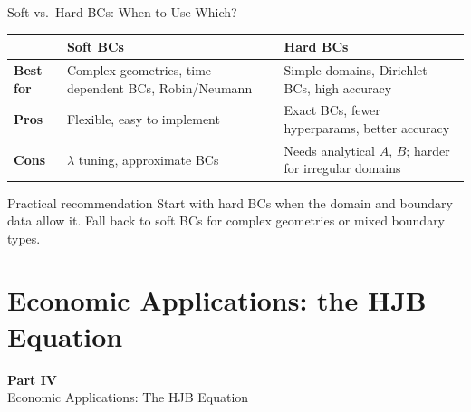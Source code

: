 \documentclass[aspectratio=169,11pt]{beamer}
\newcommand{\emphc}[1]{\textcolor{harvardcrimson}{#1}}
\begin{document}
\begin{frame}{Soft vs.\ Hard BCs: When to Use Which?}
\begin{center}
{\small
\begin{tabular}{p{2.2cm}p{4.5cm}p{4.5cm}}
\toprule
& \textbf{Soft BCs} & \textbf{Hard BCs} \\
\midrule
\textbf{Best for} & Complex geometries, time-dependent BCs, Robin/Neumann & Simple domains, Dirichlet BCs, high accuracy \\
\midrule
\textbf{Pros} & Flexible, easy to implement & Exact BCs, fewer hyperparams, better accuracy \\
\midrule
\textbf{Cons} & $\lambda$ tuning, approximate BCs & Needs analytical $A$, $B$; harder for irregular domains \\
\bottomrule
\end{tabular}
}
\end{center}

\vspace{0.3em}
\begin{block}{Practical recommendation}
Start with \emphc{hard BCs} when the domain and boundary data allow it.
Fall back to \emphc{soft BCs} for complex geometries or mixed boundary types.
\end{block}
\end{frame}


\section{Economic Applications: the HJB Equation}

\begin{frame}{}
\vfill
\begin{center}
{\Huge \textcolor{uzhblue}{\textbf{Part IV}}}\\[12pt]
{\LARGE Economic Applications: The HJB Equation}
\end{center}
\vfill
\end{frame}
\end{document}

